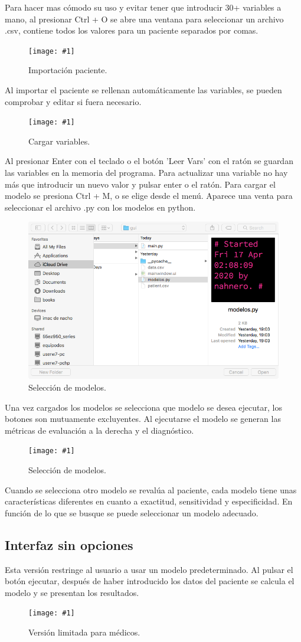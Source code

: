 \documentclass{article}
\newcommand{\incpng}[2]{
\begin{figure}[h]
\centering
\texttt{[image: \#1]}
\caption{#2}
\end{figure}
}
\begin{document}
Para hacer mas cómodo su uso y evitar tener que introducir 30+
variables a mano, al presionar Ctrl + O se abre una ventana para
seleccionar un archivo .csv, contiene todos los valores para un
paciente separados por comas.

\newpage
\incpng{../images/s3.png} {Importación paciente.}

Al importar el paciente se rellenan automáticamente las variables, se
pueden comprobar y editar si fuera necesario.

\incpng{../images/s4.png} {Cargar variables.}

Al presionar Enter con el teclado o el botón 'Leer Vars' con  el
ratón se guardan las variables en la memoria del programa. Para
actualizar una variable no hay más que introducir un nuevo valor y pulsar
enter o el ratón.
Para cargar el modelo se presiona Ctrl + M, o se elige desde el menú.
Aparece una venta para seleccionar el archivo .py con los modelos en
python.

\newpage
\begin{figure}[h]
\centering
\includegraphics[trim=3cm 1cm 3cm 0cm, width = 0.5\linewidth]{../images/s5.png}
\caption{Selección de modelos.}
\end{figure}

Una vez cargados los modelos se selecciona que modelo se desea
ejecutar, los botones son mutuamente excluyentes. Al ejecutarse el
modelo se generan las métricas de evaluación a la derecha y el
diagnóstico.

\incpng{../images/s6.png} {Selección de modelos.}

Cuando se selecciona otro modelo se revalúa al paciente, cada modelo
tiene unas características diferentes en cuanto a exactitud,
sensitividad y especificidad. En función de lo que se busque se puede
seleccionar un modelo adecuado.

\newpage
\subsection{Interfaz sin  opciones}

Esta versión restringe al usuario a usar un modelo predeterminado.
Al pulsar el botón ejecutar, después de haber introducido los datos del
paciente se calcula el modelo y se presentan los resultados.

\incpng{../images/s8.png} {Versión limitada para médicos.}
\end{document}
